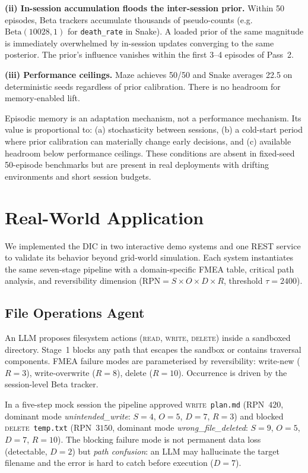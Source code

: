\documentclass[11pt,letterpaper]{article}
\begin{document}
\textbf{(ii) In-session accumulation floods the inter-session prior.}
Within 50 episodes, Beta trackers accumulate thousands of pseudo-counts
(e.g.\ $\mathrm{Beta}(10028, 1)$ for \texttt{death\_rate} in Snake). A loaded
prior of the same magnitude is immediately overwhelmed by in-session updates
converging to the same posterior. The prior's influence vanishes within the
first 3--4 episodes of Pass~2.

\textbf{(iii) Performance ceilings.} Maze achieves 50/50 and Snake averages
22.5 on deterministic seeds regardless of prior calibration. There is no
headroom for memory-enabled lift.

Episodic memory is an adaptation mechanism, not a performance mechanism. Its
value is proportional to: (a) stochasticity between sessions, (b) a cold-start
period where prior calibration can materially change early decisions, and
(c) available headroom below performance ceilings. These conditions are absent
in fixed-seed 50-episode benchmarks but are present in real deployments with
drifting environments and short session budgets.

\section{Real-World Application}
\label{sec:application}

We implemented the DIC in two interactive demo systems and one REST service to
validate its behavior beyond grid-world simulation.
Each system instantiates the same seven-stage pipeline with a domain-specific
FMEA table, critical path analysis, and reversibility dimension
($\mathrm{RPN} = S \times O \times D \times R$, threshold $\tau = 2400$).

\subsection{File Operations Agent}

An LLM proposes filesystem actions (\textsc{read}, \textsc{write}, \textsc{delete})
inside a sandboxed directory. Stage~1 blocks any path that escapes the sandbox
or contains traversal components. FMEA failure modes are parameterised by
reversibility: write-new ($R=3$), write-overwrite ($R=8$), delete ($R=10$).
Occurrence is driven by the session-level Beta tracker.

In a five-step mock session the pipeline approved \textsc{write}~\texttt{plan.md}
(RPN~$420$, dominant mode \textit{unintended\_write}: $S{=}4$, $O{=}5$, $D{=}7$,
$R{=}3$) and blocked \textsc{delete}~\texttt{temp.txt} (RPN~$3150$, dominant mode
\textit{wrong\_file\_deleted}: $S{=}9$, $O{=}5$, $D{=}7$, $R{=}10$).
The blocking failure mode is not permanent data loss (detectable, $D{=}2$) but
\textit{path confusion}: an LLM may hallucinate the target filename and the error
is hard to catch before execution ($D{=}7$).
\end{document}
